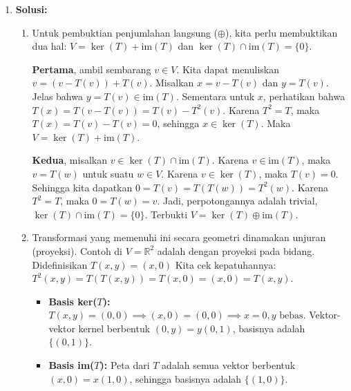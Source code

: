 \documentclass[11pt, a4paper]{article}
\begin{document}
\begin{enumerate}[leftmargin=*, label=\arabic*.]
  \item \textbf{Solusi:}
        \begin{enumerate}[label=(\alph*)]
          \item Untuk pembuktian penjumlahan langsung ($\oplus$), kita perlu membuktikan dua hal: $V = \ker(T) + \text{im}(T)$ dan $\ker(T) \cap \text{im}(T) = \{0\}$.

                \textbf{Pertama}, ambil sembarang $v \in V$. Kita dapat menuliskan $v = (v - T(v)) + T(v)$.
                Misalkan $x = v - T(v)$ dan $y = T(v)$.
                Jelas bahwa $y = T(v) \in \text{im}(T)$.
                Sementara untuk $x$, perhatikan bahwa $T(x) = T(v - T(v)) = T(v) - T^2(v)$. Karena $T^2 = T$, maka $T(x) = T(v) - T(v) = 0$, sehingga $x \in \ker(T)$.
                Maka $V = \ker(T) + \text{im}(T)$.

                \textbf{Kedua}, misalkan $v \in \ker(T) \cap \text{im}(T)$.
                Karena $v \in \text{im}(T)$, maka $v = T(w)$ untuk suatu $w \in V$.
                Karena $v \in \ker(T)$, maka $T(v) = 0$.
                Sehingga kita dapatkan $0 = T(v) = T(T(w)) = T^2(w)$. Karena $T^2 = T$, maka $0 = T(w) = v$.
                Jadi, perpotongannya adalah trivial, $\ker(T) \cap \text{im}(T) = \{0\}$. Terbukti $V = \ker(T) \oplus \text{im}(T)$.

          \item Transformasi yang memenuhi ini secara geometri dinamakan unjuran (proyeksi). Contoh di $V = \mathbb{R}^2$ adalah dengan proyeksi pada bidang.
                Didefinisikan $T(x, y) = (x, 0)$
                Kita cek kepatuhannya: $T^2(x, y) = T(T(x,y)) = T(x, 0) = (x, 0) = T(x,y)$.
                \begin{itemize}
                  \item \textbf{Basis ker($T$):}
                        $T(x, y) = (0, 0) \implies (x, 0) = (0, 0) \implies x = 0, y \text{ bebas}$.
                        Vektor-vektor kernel berbentuk $(0, y) = y(0, 1)$, basisnya adalah $\{(0, 1)\}$.
                  \item \textbf{Basis im($T$):}
                        Peta dari $T$ adalah semua vektor berbentuk $(x, 0) = x(1, 0)$, sehingga basisnya adalah $\{(1, 0)\}$.
                \end{itemize}
        \end{enumerate}


\end{enumerate}
\end{document}
